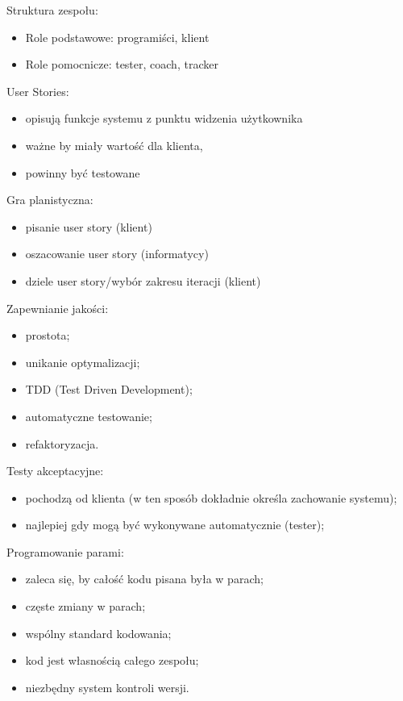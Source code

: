 \documentclass[a4paper]{article}
\begin{document}
Struktura zespołu:
    \begin{itemize}
        \item Role podstawowe: programiści, klient
        \item Role pomocnicze: tester, coach, tracker
    \end{itemize}

User Stories:
    \begin{itemize}
        \item opisują funkcje systemu z punktu widzenia użytkownika
        \item ważne by miały wartość dla klienta,
        \item powinny być testowane
    \end{itemize}

Gra planistyczna:
    \begin{itemize}
        \item pisanie user story (klient)
        \item oszacowanie user story (informatycy)
        \item dziele user story/wybór zakresu iteracji (klient)
    \end{itemize}

Zapewnianie jakości:
    \begin{itemize}
        \item prostota;
        \item unikanie optymalizacji;
        \item TDD (Test Driven Development);
        \item automatyczne testowanie;
        \item refaktoryzacja.
    \end{itemize}

Testy akceptacyjne:
    \begin{itemize}
        \item pochodzą od klienta (w ten sposób dokładnie określa
        zachowanie systemu);
        \item najlepiej gdy mogą być wykonywane automatycznie (tester);
    \end{itemize}

Programowanie parami:
    \begin{itemize}
        \item zaleca się, by całość kodu pisana była w parach;
        \item częste zmiany w parach;
        \item wspólny standard kodowania;
        \item kod jest własnością całego zespołu;
        \item niezbędny system kontroli wersji.
    \end{itemize}
\end{document}
